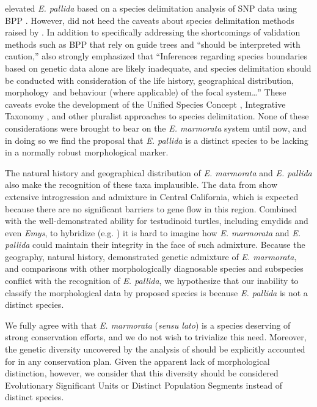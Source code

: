 \documentclass[12pt,letterpaper]{article}
\begin{document}
\citet{Spinks2014} elevated \textit{E. pallida} based on a species delimitation analysis of SNP data using BPP \citep{Yang2010b}. However, \citet{Spinks2014} did not heed the caveats about species delimitation methods raised by \citet{Carstens2013}. In addition to specifically addressing the shortcomings of validation methods such as BPP that rely on guide trees and ``should be interpreted with caution,'' \citet{Carstens2013} also strongly emphasized that ``Inferences regarding species boundaries based on genetic data alone are likely inadequate, and species delimitation should be conducted with consideration of the life history, geographical distribution, morphology and behaviour (where applicable) of the focal system\dots'' These caveats evoke the development of the Unified Species Concept \citep{Dayrat2005a,DeQueiroz2007b}, Integrative Taxonomy \citep{Padial2010}, and other pluralist approaches to species delimitation. None of these considerations were brought to bear on the \textit{E. marmorata} system until now, and in doing so we find the proposal that \textit{E. pallida} is a distinct species to be lacking in a normally robust morphological marker.

The natural history and geographical distribution of \textit{E. marmorata} and \textit{E. pallida} also make the recognition of these taxa implausible. The data from \citet{Spinks2014} show extensive introgression and admixture in Central California, which is expected because there are no significant barriers to gene flow in this region. Combined with the well-demonstrated ability for testudinoid turtles, including emydids and even \textit{Emys}, to hybridize (e.g. \citealt{Buskirk2005,Spinks2009,Parham2013}) it is hard to imagine how \textit{E. marmorata} and \textit{E. pallida} could maintain their integrity in the face of such admixture. Because the geography, natural history, demonstrated genetic admixture of \textit{E. marmorata}, and comparisons with other morphologically diagnosable species and subspecies conflict with the recognition of \textit{E. pallida}, we hypothesize that our inability to classify the morphological data by proposed species is because \textit{E. pallida} is not a distinct species. 

We fully agree with \citet{Spinks2014} that \textit{E. marmorata} (\textit{sensu lato}) is a species deserving of strong conservation efforts, and we do not wish to trivialize this need. Moreover, the genetic diversity uncovered by the analysis of \citet{Spinks2014} should be explicitly accounted for in any conservation plan. Given the apparent lack of morphological distinction, however, we consider that this diversity should be considered Evolutionary Significant Units or Distinct Population Segments instead of distinct species.
\end{document}

